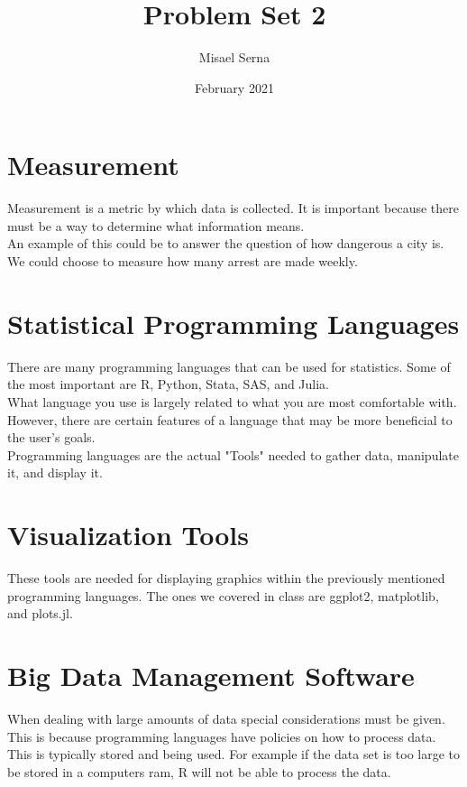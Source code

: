 \documentclass{article}
\title{Problem Set 2}
\author{Misael Serna }
\date{February 2021}
\begin{document}
\maketitle

\section{Measurement}
Measurement is a metric by which data is collected. It is important because there must be a way to determine what information means. \\

An example of this could be to answer the question of how dangerous a city is. We could choose to measure how many arrest are made weekly.



\section{Statistical Programming Languages}
There are many programming languages that can be used for statistics. Some of the most important are R, Python, Stata, SAS, and Julia. \\

What language you use is largely related to what you are most comfortable with. However, there are certain features of a language that may be more beneficial to the user's goals. \\

Programming languages are the actual "Tools" needed to gather data, manipulate it, and display it.

\section{Visualization Tools}
These tools are needed for displaying graphics within the previously mentioned programming languages. The ones we covered in class are ggplot2, matplotlib, and plots.jl.

\section{Big Data Management Software}
When dealing with large amounts of data special considerations must be given. This is because programming languages have policies on how to process data. This is typically stored and being used. For example if the data set is too large to be stored in a computers ram, R will not be able to process the data.\\
\end{document}
